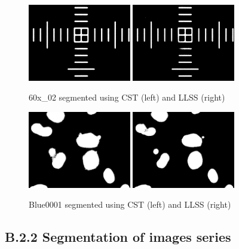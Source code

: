 \documentclass{article}
\begin{document}
\begin{figure}
\centering
\includegraphics[width=0.4\textwidth]{figures/60x_02_sct.png}
\includegraphics[width=0.4\textwidth]{figures/60x_02_slls.png}
\caption{60x\_02 segmented using CST (left) and LLSS (right)}
\label{fig:b21_image1}
\end{figure}

\begin{figure}
\centering
\includegraphics[width=0.4\textwidth]{figures/Blue0001_sct.png}
\includegraphics[width=0.4\textwidth]{figures/Blue0001_slls.png}
\caption{Blue0001 segmented using CST (left) and LLSS (right)}
\label{fig:b21_image2}
\end{figure}


\subsection*{B.2.2 Segmentation of images series}
\end{document}
